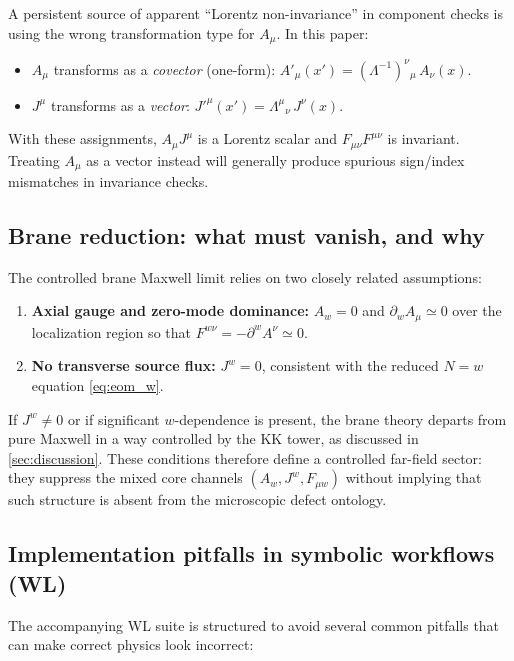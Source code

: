 \documentclass[11pt]{article}
\newcommand{\A}{A}
\newcommand{\F}{F}
\newcommand{\J}{J}
\begin{document}
A persistent source of apparent ``Lorentz non-invariance'' in component checks is
using the wrong transformation type for \(\A_\mu\). In this paper:

\begin{itemize}
\item \(\A_\mu\) transforms as a \emph{covector} (one-form):
\(\A'_\mu(x')=(\Lambda^{-1})^\nu{}_\mu\,\A_\nu(x)\).
\item \(\J^\mu\) transforms as a \emph{vector}:
\(\J'^\mu(x')=\Lambda^\mu{}_\nu\,\J^\nu(x)\).
\end{itemize}

With these assignments, \(\A_\mu\J^\mu\) is a Lorentz scalar and
\(\F_{\mu\nu}\F^{\mu\nu}\) is invariant. Treating \(\A_\mu\) as a vector instead
will generally produce spurious sign/index mismatches in invariance checks.

\subsection{Brane reduction: what must vanish, and why}

The controlled brane Maxwell limit relies on two closely related assumptions:

\begin{enumerate}
\item \textbf{Axial gauge and zero-mode dominance:} \(\A_w=0\) and
\(\partial_w\A_\mu\simeq 0\) over the localization region so that
\(\F^{w\nu}=-\partial^w\A^\nu\simeq 0\).
\item \textbf{No transverse source flux:} \(\J^w=0\), consistent with the reduced
\(N=w\) equation \cref{eq:eom_w}.
\end{enumerate}

If \(\J^w\neq 0\) or if significant \(w\)-dependence is present, the brane theory
departs from pure Maxwell in a way controlled by the KK tower, as discussed in
\cref{sec:discussion}. These conditions therefore define a controlled far-field
sector: they suppress the mixed core channels \((A_w,J^w,F_{\mu w})\) without
implying that such structure is absent from the microscopic defect ontology.

\subsection{Implementation pitfalls in symbolic workflows (WL)}

The accompanying WL suite is structured to avoid several common pitfalls that can
make correct physics look incorrect:
\end{document}
